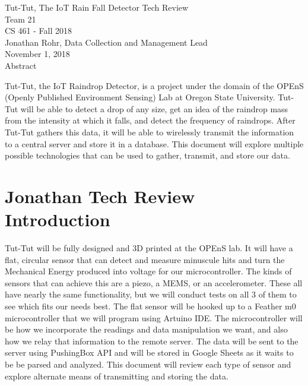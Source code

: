 \documentclass[letterpaper,10pt,draftclsnofoot,onecolumn]{article}
\begin{document}
\begin{titlepage}
\vspace*{\fill}
\begin{center}
{\Large Tut-Tut, The IoT Rain Fall Detector Tech Review}
\\[0.3cm]

{\large Team 21}
\\[0.3cm]

{\large CS 461 - Fall 2018}
\\[0.3cm]

{\large Jonathan Rohr, Data Collection and Management Lead}
\\[0.3cm]

{\large November 1, 2018}
\\[1cm]

{\Large Abstract}
\end{center}
Tut-Tut, the IoT Raindrop Detector, is a project under the domain of the OPEnS (Openly Published Environment Sensing) Lab at Oregon State University. Tut-Tut will be able to detect a drop of any size, get an idea of the raindrop mass from the intensity at which it falls, and detect the frequency of raindrops. After Tut-Tut gathers this data, it will be able to wirelessly transmit the information to a central server and store it in a database. This document will explore multiple possible technologies that can be used to gather, transmit, and store our data.
\vspace*{\fill}
\end{titlepage}

\section{Jonathan Tech Review Introduction}
Tut-Tut will be fully designed and 3D printed at the OPEnS lab. It will have a flat, circular sensor that can detect and measure minuscule hits and turn the Mechanical Energy produced into voltage for our microcontroller. The kinds of sensors that can achieve this are a piezo, a MEMS, or an accelerometer. These all have nearly the same functionality, but we will conduct tests on all 3 of them to see which fits our needs best. The flat sensor will be hooked up to a Feather m0 microcontroller that we will program using Artuino IDE. The microcontroller will be how we incorporate the readings and data manipulation we want, and also how we relay that information to the remote server. The data will be sent to the server using PushingBox API and will be stored in Google Sheets as it waits to be be parsed and analyzed. This document will review each type of sensor and explore alternate means of transmitting and storing the data.
\end{document}
